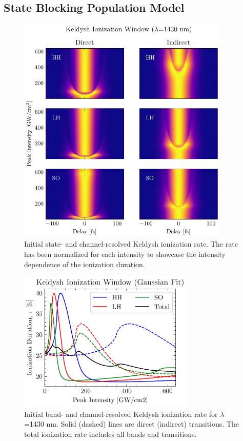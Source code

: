 \subsection{State Blocking Population Model}
\label{sec:SB_population_model}

\begin{figure}
	\centering
	\includegraphics[width=0.9\textwidth]{figures/chap4/Keldysh_SingleInt_IonizationWindow.pdf}
	\caption{Initial state- and channel-resolved Keldysh ionization rate. The rate has been normalized for each intensity to showcase the intensity dependence of the ionization duration.}
	\label{fig:Keldysh_SingleInt_IonizationWindow}
\end{figure}

\begin{figure}
	\centering
	\includegraphics[width=0.75\textwidth]{figures/chap4/Keldysh_SingleInt_IonizationWindowFit.pdf}
	\caption{Initial band- and channel-resolved Keldysh ionization rate for $\lambda$=1430 nm. Solid (dashed) lines are direct (indirect) transitions. The total ionization rate includes all bands and transitions.}
	\label{fig:Keldysh_SingleInt_IonizationWindowFit}
\end{figure}

